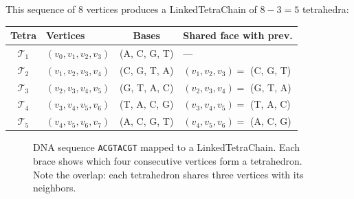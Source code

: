 This sequence of 8 vertices produces a LinkedTetraChain of $8 - 3 = 5$ tetrahedra:

\begin{center}
\renewcommand{\arraystretch}{1.15}
\begin{tabular}{clcl}
\toprule
\textbf{Tetra} & \textbf{Vertices} & \textbf{Bases} & \textbf{Shared face with prev.} \\
\midrule
$\mathcal{T}_1$ & $(v_0, v_1, v_2, v_3)$ & (A, C, G, T) & --- \\
$\mathcal{T}_2$ & $(v_1, v_2, v_3, v_4)$ & (C, G, T, A) & $(v_1, v_2, v_3) = $ (C, G, T) \\
$\mathcal{T}_3$ & $(v_2, v_3, v_4, v_5)$ & (G, T, A, C) & $(v_2, v_3, v_4) = $ (G, T, A) \\
$\mathcal{T}_4$ & $(v_3, v_4, v_5, v_6)$ & (T, A, C, G) & $(v_3, v_4, v_5) = $ (T, A, C) \\
$\mathcal{T}_5$ & $(v_4, v_5, v_6, v_7)$ & (A, C, G, T) & $(v_4, v_5, v_6) = $ (A, C, G) \\
\bottomrule
\end{tabular}
\end{center}

\begin{figure}[htbp]
\centering
{}
\caption{DNA sequence \texttt{ACGTACGT} mapped to a LinkedTetraChain.
Each brace shows which four consecutive vertices form a tetrahedron.
Note the overlap: each tetrahedron shares three vertices with its neighbors.}
\label{fig:dna-mapping}
\end{figure}

